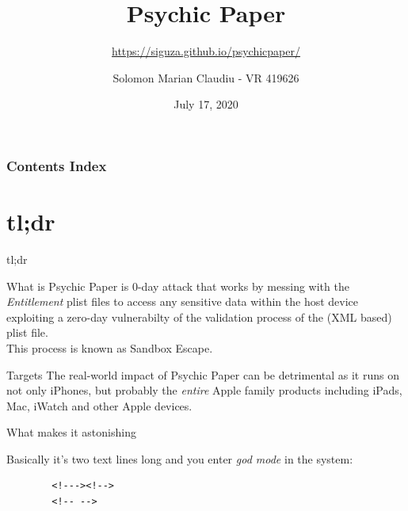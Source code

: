 \documentclass{beamer}
\title{Psychic Paper}
\subtitle{\href{https://siguza.github.io/psychicpaper/}{https://siguza.github.io/psychicpaper/}}
\author{Solomon Marian Claudiu - VR 419626}
\date{July 17, 2020}
\begin{document}
\maketitle

\begin{frame}\frametitle{Contents Index}
\tableofcontents
\end{frame}

\section{tl;dr}
\begin{frame}[fragile]{tl;dr}\small 
    \begin{block}{What is}
    Psychic Paper is 0-day attack that works by messing with the \emph{Entitlement} plist files to access any sensitive data within the host device exploiting a zero-day vulnerabilty of the validation process of the (XML based) plist file.\\
    This process is known as Sandbox Escape.
    \end{block}
    \begin{block}{Targets}
    The real-world impact of Psychic Paper can be detrimental as it runs on not only iPhones, but probably the \emph{entire} Apple family products including iPads, Mac, iWatch and other Apple devices.
    \end{block}
    \begin{block}{What makes it astonishing}
    \begin{multicols}{2}
        \footnotesize Basically it's two text lines long and you enter \emph{god mode} in the system:
        \begin{verbatim}
        <!---><!-->
        <!-- -->
        \end{verbatim}
    \end{multicols}
    \end{block}
\end{frame}
\end{document}
